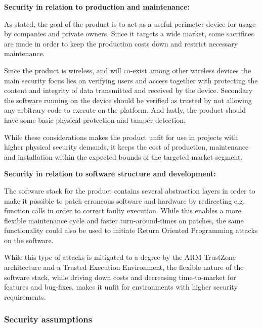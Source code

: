 \documentclass[10pt]{article}
\begin{document}
        \textbf{Security in relation to production and maintenance:}

        As stated, the goal of the product is to act as a useful perimeter
        device for usage by companies and private owners. Since it targets a
        wide market, some sacrifices are made in order to keep the production
        costs down and restrict necessary maintenance.

        Since the product is wireless, and will co-exist among other wireless
        devices the main security focus lies on verifying users and access
        together with protecting the content and integrity of data transmitted
        and received by the device. Secondary the software running on the
        device should be verified as trusted by not allowing any arbitrary code
        to execute on the platform. And lastly, the product should have some
        basic physical protection and tamper detection.

        While these considerations makes the product unfit for use in projects
        with higher physical security demands, it keeps the cost of production,
        maintenance and installation within the expected bounds of the targeted
        market segment.

        \textbf{Security in relation to software structure and development:}

        The software stack for the product contains several abstraction layers
        in order to make it possible to patch erroneous software and hardware
        by redirecting e.g. function calls in order to correct faulty
        execution. While this enables a more flexible maintenance cycle and
        faster turn-around-times on patches, the same functionality could also
        be used to initiate Return Oriented Programming attacks on the
        software.

        While this type of attacks is mitigated to a degree by the ARM
        TrustZone architecture and a Trusted Execution Environment, the
        flexible nature of the software stack, while driving down costs and
        decreasing time-to-market for features and bug-fixes, makes it unfit
        for environments with higher security requirements.

      \subsubsection{Security assumptions}
\end{document}
